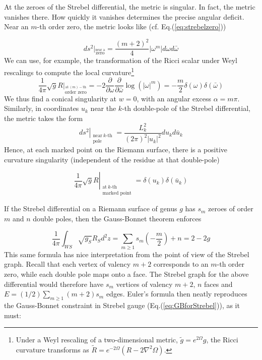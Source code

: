 \documentclass[english]{article}
\renewcommand{\>}{\rangle}
\newcommand{\<}{\langle}
\newcommand{\w}{\omega}
\renewcommand{\(}{\left(}
\renewcommand{\)}{\right)}
\begin{document}
 At the zeroes of the Strebel differential, the metric is singular. In fact, the metric vanishes there. How quickly it vanishes determines the precise angular deficit. Near an $m$-th order zero, the metric looks like (cf. Eq.(\ref{eq:strebelzero}))

 \begin{equation}
     ds^2 \big|_{\overset{\text{near a}}{\text{zero}}}=\frac{(m+2)^2}{4}|\w^{m}|d\w d\bar{\w}
 \end{equation}
 We can use, for example, the transformation of the Ricci scalar under Weyl rescalings to compute the local curvature\footnote{Under a Weyl rescaling of a two-dimensional metric, $\tilde{g} = e^{2 \Omega}g$, the Ricci curvature transforms as $\tilde{R} = e^{-2 \Omega} \left( R - 2 \nabla^{2} \Omega \right)$.}
 \begin{equation}
      \frac{1}{4\pi} \sqrt{g} R\big |_{\overset{\text{at} \ (m)-\text{th}}{\text{order zero}} } = - 2 \frac{\partial}{\partial \w} \frac{\partial}{\partial \bar{\w}} \log\left( |\w|^{m} \right) =  -\frac{m}{2} \delta(\w) \delta(\bar{\w}) 
 \end{equation}
We thus find a conical singularity at $w=0$, with an angular excess $\alpha = m\pi$. Similarly, in coordinates $u_{k}$ near the $k$-th double-pole of the Strebel differential, the metric takes the form 
\begin{equation}
     \left.ds^2\right|_{\substack{\text{near} \ k\text{-th}\\\text{pole}}} = \frac{L_{k}^2}{(2\pi)^2 |u_{k}|^2}du_k d\bar{u}_k
\end{equation}
Hence, at each marked point on the Riemann surface, there is a positive curvature singularity (independent of the residue at that double-pole)

\begin{equation}
      \left.\frac{1}{4\pi} \sqrt{g} R \right|_{\substack{\text{at} \ k\text{-th}\\\text{marked point}} } =  \delta(u_{k})\delta(\bar{u}_{k})
\end{equation}


If the Strebel differential on a Riemann surface of genus $g$ has $s_{m}$ zeroes of order $m$ and $n$ double poles, then the Gauss-Bonnet theorem enforces

\begin{equation}
   \frac{1}{4 \pi} \int_{WS} \sqrt{g_{S}} R_{S} d^2 z = \sum_{m \geq 1} s_{m} \left(-\frac{m}{2}\right) + n = 2-2g \label{eq:GBforStrebel}
\end{equation}
This same formula has nice interpretation from the point of view of the Strebel graph. Recall that each vertex of valency $m+2$ corresponds to an $m$-th order zero, while each double pole maps onto a face. The Strebel graph for the above differential would therefore have $s_{m}$ vertices of valency $m+2$, $n$ faces and $E= (1/2) \sum_{m \geq 1} (m+2) s_{m} $ edges. Euler's formula then neatly reproduces the Gauss-Bonnet constraint in Strebel gauge  (Eq.(\eqref{eq:GBforStrebel})), as it must:  
\end{document}

